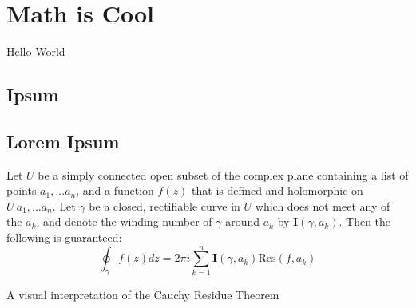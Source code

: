 \documentclass{./scibookneue-print}
\begin{document}
\chapter{Math is Cool}
Hello World \lipsum[1-8]
\section{Ipsum}

\lipsum[1]
\lipsum[2]
\lipsum[3]

\lipsum[1]
\lipsum[2]
\lipsum[3]

\lipsum[1]


\lipsum[2]
\lipsum[3]

\section{Lorem Ipsum}
\lipsum[1]
\begin{mthm}
Let $U$ be a simply connected open subset of the complex plane containing a list of points $a_1, ... a_n$, 
and a function $f(z)$ that is defined and holomorphic on $U \ {a_1,\ldots a_n}$.
Let $\gamma$ be a closed, rectifiable curve in $U$ which does not meet any of the $a_k$, 
and denote the winding number of $\gamma$ around $a_k$ by $\mathbf{I}(\gamma, a_k)$.
Then the following is guaranteed:
\begin{equation}
	\oint_\gamma f(z) dz = 2\pi i \sum_{k=1} ^n \mathbf{I}(\gamma, a_k) \mathrm{Res}\left(f,a_k\right)
\end{equation}
\end{mthm}


\begin{mproof}
	\lipsum[5]
\end{mproof}
\medskip
\begin{center}

	\medskip
	\small{A visual interpretation of the Cauchy Residue Theorem}
\end{center}
\lipsum[1]
\end{document}
